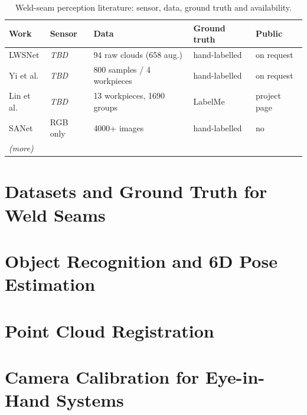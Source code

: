 \begin{table}[htbp]
\caption{Weld-seam perception literature: sensor, data, ground truth and availability.}
\label{tab:lit_seam}
\centering\small
\begin{tabular}{@{}lllll@{}}
\toprule
Work & Sensor & Data & Ground truth & Public \\
\midrule
LWSNet \cite{song2025lwsnet} & \textit{TBD} & 94 raw clouds (658 aug.) & hand-labelled & on request \\
Yi et al. \cite{yi2026seam} & \textit{TBD} & 800 samples / 4 workpieces & hand-labelled & on request \\
Lin et al. \cite{lin2026coating} & \textit{TBD} & 13 workpieces, 1690 groups & LabelMe & project page \\
SANet \cite{zhu2025sanet} & RGB only & 4000+ images & hand-labelled & no \\
\textit{(more)} & & & & \\
\bottomrule
\end{tabular}
\end{table}

\section{Datasets and Ground Truth for Weld Seams}
\label{sec:bg_datasets}

\section{Object Recognition and 6D Pose Estimation}
\label{sec:bg_pose}

\section{Point Cloud Registration}
\label{sec:bg_icp}

\section{Camera Calibration for Eye-in-Hand Systems}
\label{sec:bg_calib}

